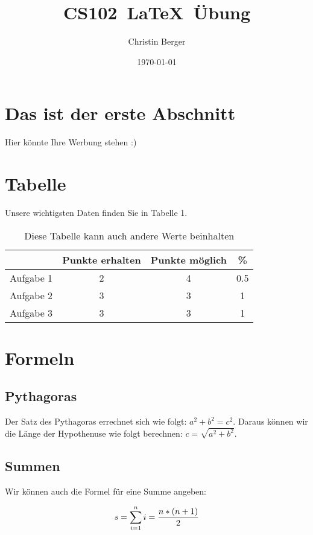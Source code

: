 \documentclass{article}
\author{Christin Berger}
\title{CS102\ \LaTeX\ Übung}
\date{\today}
\begin{document}
\maketitle
\section{Das ist der erste Abschnitt}
Hier könnte Ihre Werbung stehen :)
\section{Tabelle}
Unsere wichtigsten Daten finden Sie in Tabelle 1.
\begin{table}[h]
\begin{tabular}{c|c|c|c}
\quad & Punkte erhalten & Punkte möglich & \% \\
\hline
Aufgabe 1 & 2 & 4 & 0.5\\
Aufgabe 2 & 3 & 3 & 1\\
Aufgabe 3 & 3 & 3 & 1\\
\end{tabular}
\caption{Diese Tabelle kann auch andere Werte beinhalten}
\end{table}
\label{Tab 1}
\section{Formeln}
\subsection{Pythagoras}
Der Satz des Pythagoras errechnet sich wie folgt: $a^{2}+b^{2}=c^{2}.$ Daraus können wir die Länge der Hypothenuse wie folgt berechnen: $c=\sqrt{a^{2}+b^{2}}.$
\subsection{Summen}
\begin{flushleft}
Wir können auch die Formel für eine Summe angeben:\\
\end{flushleft}
\begin{equation}
\centering
s=\sum_{i=1}^n{i}=\frac{n*(n+1)}{2}
\end{equation}
\end{document}
